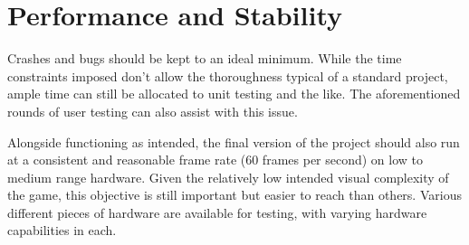 \documentclass{report}
\begin{document}
\section{Performance and Stability}

Crashes and bugs should be kept to an ideal minimum. While the time constraints imposed don't allow the thoroughness typical of a standard project, ample time can still be allocated to unit testing and the like. The aforementioned rounds of user testing can also assist with this issue.

Alongside functioning as intended, the final version of the project should also run at a consistent and reasonable frame rate (60 frames per second) on low to medium range hardware. Given the relatively low intended visual complexity of the game, this objective is still important but easier to reach than others. Various different pieces of hardware are available for testing, with varying hardware capabilities in each.
\end{document}
